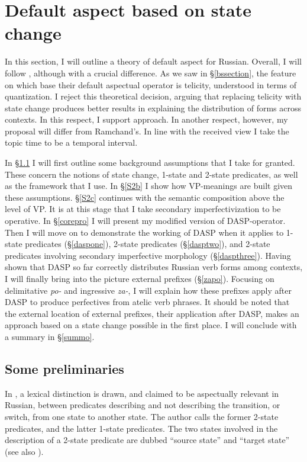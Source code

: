 \documentclass[output=paper,colorlinks,citecolor=brown]{langscibook}
\begin{document}
\section{Default aspect based on state change}\label{sec3}
In this section, I will outline 
a theory of default aspect for Russian. Overall, I will follow \citet{Bohne2004}, although with a crucial difference. 
As we saw in \S \ref{bssection}, the feature on which \citet{Bohne2004} base their default aspectual operator is telicity, understood in terms of quantization.  
I reject this theoretical  
decision, arguing that replacing telicity with state change produces better results in explaining the distribution of forms across contexts. In this respect, I support  approach. In another respect, however, my proposal will differ from Ramchand's. In line with the received view I take the topic time to be a temporal interval.   

In \S \ref{S2} I will first outline some background assumptions that I take for granted. These concern the notions of state change, 1-state and 2-state predicates, as well as the framework that I use.  
In \S \ref{S2b} I show how VP-meanings are built given these assumptions.  
\S \ref{S2c} continues with the semantic composition above the level of VP. It is at this stage that I take secondary imperfectivization to be operative. In \S \ref{corepro} I will present my modified version of  DASP-operator. Then I will move on   
to demonstrate the working of DASP when it applies to 1-state predicates (\S \ref{daspone}), 2-state predicates (\S \ref{dasptwo}), and 2-state predicates involving secondary imperfective morphology (\S \ref{daspthree}). Having shown that DASP so far correctly distributes Russian verb forms among contexts, I will finally bring into the picture external prefixes
(\S \ref{zapo}).
Focusing on delimitative \textit{po-} and ingressive \textit{za-}, I will explain how these prefixes apply after DASP to produce perfectives from atelic verb phrases.  
It should be noted that the external location of external prefixes, their application after DASP,  makes an approach based on a state change possible in the first place. 
I will conclude with a summary in \S \ref{summo}.  
 
\subsection{Some preliminaries} \label{S2}
In \citet{Klein1995}, a lexical distinction is drawn, and claimed to be aspectually relevant in Russian, between predicates describing and not describing the transition, or switch, from one 
state to another state. The author calls the former 2-state predicates, 
and the latter 1-state predicates. The two states involved in the description of a 2-state predicate are
dubbed ``source state'' and ``target state'' (see also \citealt{Klein1994}). 
\end{document}
